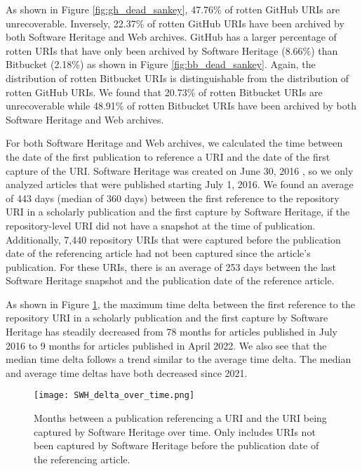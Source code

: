 As shown in Figure \ref{fig:gh_dead_sankey}, 47.76\% of rotten GitHub URIs are unrecoverable. Inversely, 22.37\% of rotten GitHub URIs have been archived by both Software Heritage and Web archives. GitHub has a larger percentage of rotten URIs that have only been archived by Software Heritage (8.66\%) than Bitbucket (2.18\%) as shown in Figure \ref{fig:bb_dead_sankey}. Again, the distribution of rotten Bitbucket URIs is distinguishable from the distribution of rotten GitHub URIs. We found that 20.73\% of rotten Bitbucket URIs are unrecoverable while 48.91\% of rotten Bitbucket URIs have been archived by both Software Heritage and Web archives.  

For both Software Heritage and Web archives, we calculated the time between the date of the first publication to reference a URI and the date of the first capture of the URI. Software Heritage was created on June 30, 2016 \cite{dicosmo_swhblog}, so we only analyzed articles that were published starting July 1, 2016. We found an average of 443 days (median of 360 days) between the first reference to the repository URI in a scholarly publication and the first capture by Software Heritage, if the repository-level URI did not have a snapshot at the time of publication. Additionally, 7,440 repository URIs that were captured before the publication date of the referencing article had not been captured since the article's publication. For these  URIs, there is an average of 253 days between the last Software Heritage snapshot and the publication date of the reference article. 

As shown in Figure \ref{fig:swh_delta},
the maximum time delta between the first reference to the repository URI in a scholarly publication and the first capture by Software Heritage has steadily decreased from 78 months for articles published in July 2016 to 9 months for articles published in April 2022. We also see that the median time delta follows a trend similar to the average time delta. The median and average time deltas have both decreased since 2021. 

\begin{figure}
    \centering
    \texttt{[image: SWH\_delta\_over\_time.png]}
    \caption{Months between a publication referencing a URI and the URI being captured by Software Heritage over time. Only includes URIs not been captured by Software Heritage before the publication date of the referencing article.}
    \label{fig:swh_delta}
\end{figure}

